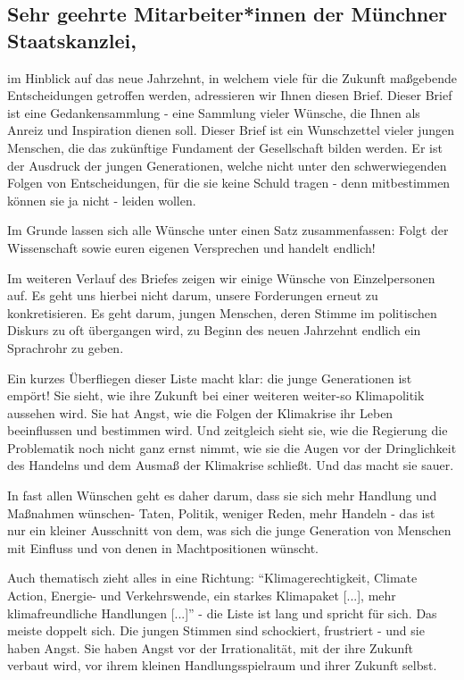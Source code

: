 \documentclass[a4paper, 11.5pt]{article}
\begin{document}
\makeheader


\vspace{\baselineskip}

\subsection*{Sehr geehrte Mitarbeiter*innen der Münchner Staatskanzlei,}

im Hinblick auf das neue Jahrzehnt, in welchem viele für die Zukunft maßgebende Entscheidungen getroffen werden, adressieren wir Ihnen diesen Brief. Dieser Brief ist eine Gedankensammlung - eine Sammlung vieler Wünsche, die Ihnen als Anreiz und Inspiration dienen soll. Dieser Brief ist ein Wunschzettel vieler jungen Menschen, die das zukünftige Fundament der Gesellschaft bilden werden. Er ist der Ausdruck der jungen Generationen, welche nicht unter den schwerwiegenden Folgen von Entscheidungen, für die sie keine Schuld tragen - denn mitbestimmen können sie ja nicht - leiden wollen.

Im Grunde lassen sich alle Wünsche unter einen Satz zusammenfassen: Folgt der Wissenschaft sowie euren eigenen Versprechen und handelt endlich!


Im weiteren Verlauf des Briefes zeigen wir einige Wünsche von Einzelpersonen auf. Es geht uns hierbei nicht darum, unsere Forderungen erneut zu konkretisieren. Es geht darum, jungen Menschen, deren Stimme im politischen Diskurs zu oft übergangen wird, zu Beginn des neuen Jahrzehnt endlich ein Sprachrohr zu geben.


Ein kurzes Überfliegen dieser Liste macht klar: die junge Generationen ist empört! Sie sieht, wie ihre Zukunft bei einer weiteren weiter-so Klimapolitik aussehen wird. Sie hat Angst, wie die Folgen der Klimakrise ihr Leben beeinflussen und bestimmen wird. Und zeitgleich sieht sie, wie die Regierung die Problematik noch nicht ganz ernst nimmt, wie sie die Augen vor der Dringlichkeit des Handelns und dem Ausmaß der Klimakrise schließt. Und das macht sie sauer. 

In fast allen Wünschen geht es daher darum, dass sie sich mehr Handlung und Maßnahmen wünschen- Taten, Politik, weniger Reden, mehr Handeln - das ist nur ein kleiner Ausschnitt von dem, was sich die junge Generation von Menschen mit Einfluss und von denen in Machtpositionen wünscht. 

Auch thematisch zieht alles in eine Richtung: “Klimagerechtigkeit, Climate Action, Energie- und Verkehrswende, ein starkes Klimapaket [...], mehr klimafreundliche Handlungen [...]” - die Liste ist lang und spricht für sich. Das meiste doppelt sich. Die jungen Stimmen sind schockiert, frustriert - und sie haben Angst. Sie haben Angst vor der Irrationalität, mit der ihre Zukunft verbaut wird, vor ihrem kleinen Handlungsspielraum und ihrer Zukunft selbst.
\end{document}
